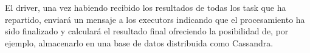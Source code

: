 El driver, una vez habiendo recibido los resultados de todas los task que ha repartido, enviará un mensaje a los executors indicando que el procesamiento ha sido finalizado y calculará el resultado final ofreciendo la posibilidad de, por ejemplo, almacenarlo en una base de datos distribuida como Cassandra.\\






